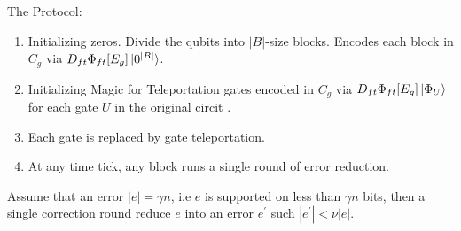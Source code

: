 \documentclass[manuscript,screen,review]{acmart}
\begin{document}
The Protocol:
\begin{enumerate}
  \item Initializing zeros. Divide the qubits into $|B|$-size blocks. Encodes each block in $C_{g}$ via $D_{ft} \Phi_{ft}[E_{g}] \ket{0^{|B|}}$.
  \item Initializing Magic for Teleportation gates encoded in $C_{g}$ via $D_{ft} \Phi_{ft}[E_{g}] \ket{\Phi_{U}}$ for each gate $U$ in the original circit .
  \item Each gate is replaced by gate teleportation.  
  \item At any time tick, any block runs a single round of error reduction.  
\end{enumerate}


\begin{claim}
  \label{claim:error} 
  Assume that an error $|e| = \gamma n $, i.e $e$ is supported on less than $\gamma n$ bits, then a single correction round reduce $e$ into an error $e^\prime$ such $|e^{\prime}| < \nu |e|$. 
\end{claim}


\end{document}
